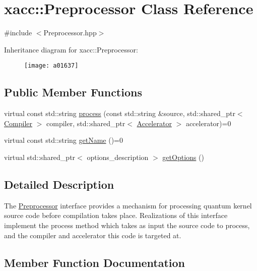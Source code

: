 \hypertarget{a01637}{}\section{xacc\+:\+:Preprocessor Class Reference}
\label{a01637}


{\ttfamily \#include $<$Preprocessor.\+hpp$>$}

Inheritance diagram for xacc\+:\+:Preprocessor\+:\begin{figure}[H]
\begin{center}
\leavevmode
\texttt{[image: a01637]}
\end{center}
\end{figure}
\subsection*{Public Member Functions}
\begin{DoxyCompactItemize}
\item 
virtual const std\+::string \hyperlink{a01637_ae59b5a2963f8bcc84b590a83f4749e19}{process} (const std\+::string \&source, std\+::shared\+\_\+ptr$<$ \hyperlink{a01629}{Compiler} $>$ compiler, std\+::shared\+\_\+ptr$<$ \hyperlink{a01613}{Accelerator} $>$ accelerator)=0
\item 
virtual const std\+::string \hyperlink{a01637_a36671f4c062d61e230306edc404774cd}{get\+Name} ()=0
\item 
virtual std\+::shared\+\_\+ptr$<$ options\+\_\+description $>$ \hyperlink{a01637_a96f5600ea47628b66917c7b90250e7f1}{get\+Options} ()
\end{DoxyCompactItemize}


\subsection{Detailed Description}
The \hyperlink{a01637}{Preprocessor} interface provides a mechanism for processing quantum kernel source code before compilation takes place. Realizations of this interface implement the process method which takes as input the source code to process, and the compiler and accelerator this code is targeted at. 

\subsection{Member Function Documentation}
\mbox{\label{a01637_a36671f4c062d61e230306edc404774cd}} 
